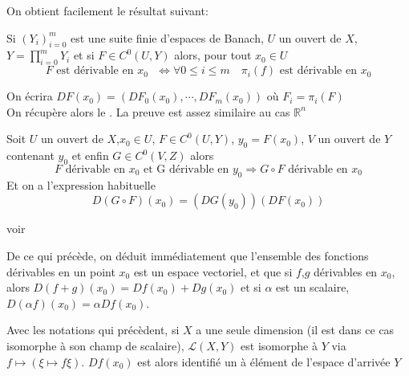 \documentclass[memoire.tex]{subfiles}
\begin{document}
On obtient facilement le résultat suivant:
\begin{proposition}
    Si $(Y_i)_{i=0}^m$ est une suite finie d'espaces de Banach, $U$ un ouvert de $X$, $Y=\prod_{i=0}^m Y_i$ 
    et si $F\in C^0(U,Y)$ alors, pour tout $x_0\in U$
    \begin{equation*}
    F \text{ est dérivable en $x_0$ }
    \Leftrightarrow \forall 0\leq i \leq m\quad  \pi_i(f) \text{ est dérivable en $x_0$} 
    \end{equation*}
\end{proposition}
On écrira $DF(x_0)=(DF_0(x_0),\cdots,DF_m(x_0))$ où $F_i=\pi_i(F)$
\\
On récupère alors le . La preuve est assez similaire au cas $\mathbb{R}^n$
\begin{proposition}
    Soit $U$ un ouvert de $X$,$x_0\in U$, $F\in C^0(U,Y)$, $y_0=F(x_0)$, $V$ un ouvert de $Y$ contenant $y_0$ et enfin  $G\in C^0(V,Z)$ alors 
    \begin{equation*}
        F\text{ dérivable en  $x_0$ et G dérivable en $y_0$}\Rightarrow G\circ F \text{ dérivable en $x_0$}  
    \end{equation*}
Et on a l'expression habituelle
\begin{equation*}
    D(G\circ F)(x_0)= (DG(y_0))(DF(x_0))
\end{equation*}

\end{proposition}
\begin{preuve}
    voir \cite{dieudonne1969fma8}
\end{preuve}


De ce qui précède, on déduit immédiatement que l'ensemble des fonctions dérivables en un point $x_0$ est un espace vectoriel, et que si $f$,$g$ dérivables en $x_0$, alors 
$D (f+g)(x_0)=Df(x_0)+Dg(x_0)$ et si $\alpha$ est un scalaire,
$D(\alpha f)(x_0)=\alpha Df(x_0)$.
\begin{remarque}\label{remarque 1-dim}
    Avec les notations qui précèdent, si $X$ a une seule dimension (il est dans ce cas isomorphe à son champ de scalaire), $\mathcal{L}(X,Y)$ est isomorphe à $Y$ via $f\mapsto (\xi\mapsto f\xi)$.
    $Df(x_0)$ est alors identifié un à élément de l'espace d'arrivée $Y$
\end{remarque}
   
\end{document}
